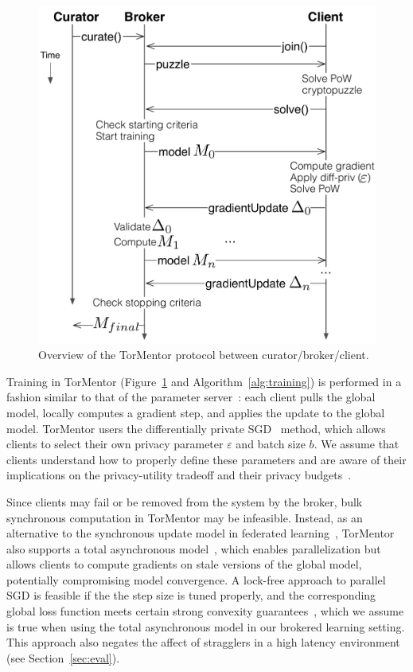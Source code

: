 \begin{figure}[t]
  \centering
  \includegraphics[width=.9\linewidth]{fig/tormentor-protocol.pdf}
  \caption{Overview of the TorMentor protocol between
    curator/broker/client.
    }
  \label{fig:protocol}
\end{figure}

Training in TorMentor (Figure~\ref{fig:protocol} and 
Algorithm~\ref{alg:training}) is performed in a
fashion similar to that of the parameter server~\cite{Li:2014}:
each client pulls the global model, locally computes a gradient step,
and applies the update to the global model. TorMentor users the
differentially private SGD~\cite{Song:2013} method, which allows
clients to select their own privacy parameter $\varepsilon$ and batch
size $b$. We assume that clients understand how to properly define
these parameters and are aware of their implications on the
privacy-utility tradeoff and their privacy budgets~\cite{Dwork:2014}.

Since clients may fail or be removed from the system by the broker,
bulk synchronous computation in TorMentor may be infeasible. Instead,
as an alternative to the synchronous update model in federated
learning~\cite{McMahan:2017}, TorMentor also supports a total
asynchronous model~\cite{Hsieh:2017, Li:2014}, which enables
parallelization but allows clients to compute gradients on stale
versions of the global model, potentially compromising model
convergence. A lock-free approach to parallel SGD is feasible if
the the step size is tuned properly, and the corresponding global loss
function meets certain strong convexity guarantees~\cite{Recht:2011},
which we assume is true when using the total asynchronous model
in our brokered learning setting. This approach also negates the affect
of stragglers in a high latency environment (see 
Section~\ref{sec:eval}).

